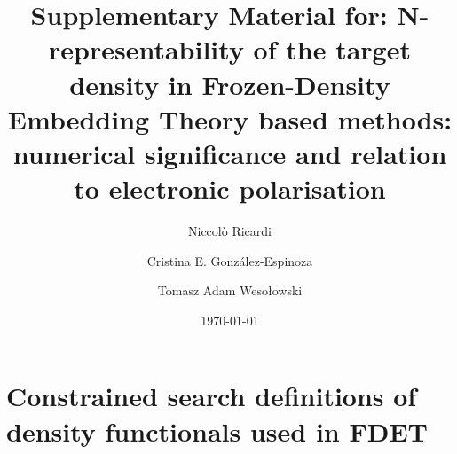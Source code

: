 \documentclass[amsmath,amssymb,preprint,aip,jcp]{revtex4-1}
\begin{document}
\author{Niccol\`{o} Ricardi}
\author{Cristina E. Gonz\'{a}lez-Espinoza}
\author{Tomasz Adam Weso\l{}owski}
% 
\date{\today}
\title{Supplementary Material for:
N-representability of the target density in Frozen-Density Embedding Theory based methods: numerical significance and relation to electronic polarisation}

\maketitle
\section{Constrained search definitions of density functionals used in FDET}
\end{document}

